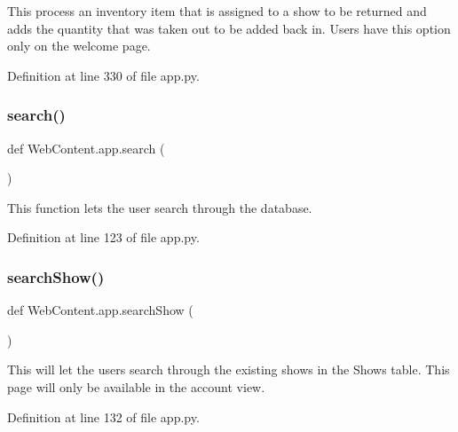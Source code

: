 \begin{DoxyVerb}This process an inventory item that is assigned to a show
to be returned and adds the quantity that was taken out 
to be added back in. Users have this option only on the welcome page. 
\end{DoxyVerb}
 

Definition at line 330 of file app.\+py.

\mbox{\label{namespace_web_content_1_1app_a6d7ee2ff030bada6042b07189d92a01c}} 
\subsubsection{\texorpdfstring{search()}{search()}}
{\footnotesize\ttfamily def Web\+Content.\+app.\+search (\begin{DoxyParamCaption}{ }\end{DoxyParamCaption})}

\begin{DoxyVerb}This function lets the user search
through the database.
\end{DoxyVerb}
 

Definition at line 123 of file app.\+py.

\mbox{\label{namespace_web_content_1_1app_a26131900d865fe102463bc8eb3a797ef}} 
\subsubsection{\texorpdfstring{search\+Show()}{searchShow()}}
{\footnotesize\ttfamily def Web\+Content.\+app.\+search\+Show (\begin{DoxyParamCaption}{ }\end{DoxyParamCaption})}

\begin{DoxyVerb}This will let the users search
through the existing shows in the Shows table.
This page will only be available in the account view.
\end{DoxyVerb}
 

Definition at line 132 of file app.\+py.

\mbox{\label{namespace_web_content_1_1app_a6be53570f8642dc8f71ad686863336cc}} 
